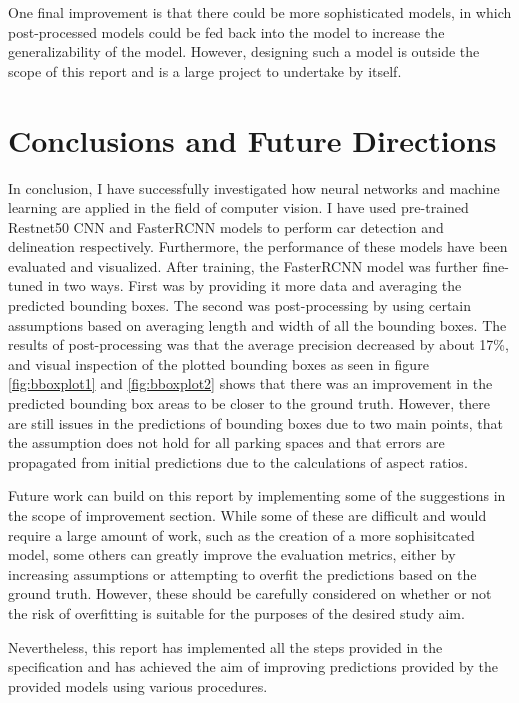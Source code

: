 \documentclass[man]{apa7}
\begin{document}
One final improvement is that there could be more sophisticated models, in which post-processed models could be fed back into the model to increase the generalizability of the model. However, designing such a model is outside the scope of this report and is a large project to undertake by itself.

\newpage

\section{Conclusions and Future Directions}

In conclusion, I have successfully investigated how neural networks and machine learning are applied in the field of computer vision. I have used pre-trained Restnet50 CNN and FasterRCNN models to perform car detection and delineation respectively. Furthermore, the performance of these models have been evaluated and visualized. After training, the FasterRCNN model was further fine-tuned in two ways. First was by providing it more data and averaging the predicted bounding boxes. The second was post-processing by using certain assumptions based on averaging length and width of all the bounding boxes. The results of post-processing was that the average precision decreased by about 17\%, and visual inspection of the plotted bounding boxes as seen in figure \ref{fig:bboxplot1} and \ref{fig:bboxplot2} shows that there was an improvement in the predicted bounding box areas to be closer to the ground truth. However, there are still issues in the predictions of bounding boxes due to two main points, that the assumption does not hold for all parking spaces and that errors are propagated from initial predictions due to the calculations of aspect ratios.

Future work can build on this report by implementing some of the suggestions in the scope of improvement section. While some of these are difficult and would require a large amount of work, such as the creation of a more sophisitcated model, some others can greatly improve the evaluation metrics, either by increasing assumptions or attempting to overfit the predictions based on the ground truth. However, these should be carefully considered on whether or not the risk of overfitting is suitable for the purposes of the desired study aim.

Nevertheless, this report has implemented all the steps provided in the specification and has achieved the aim of improving predictions provided by the provided models using various procedures. 
\end{document}
